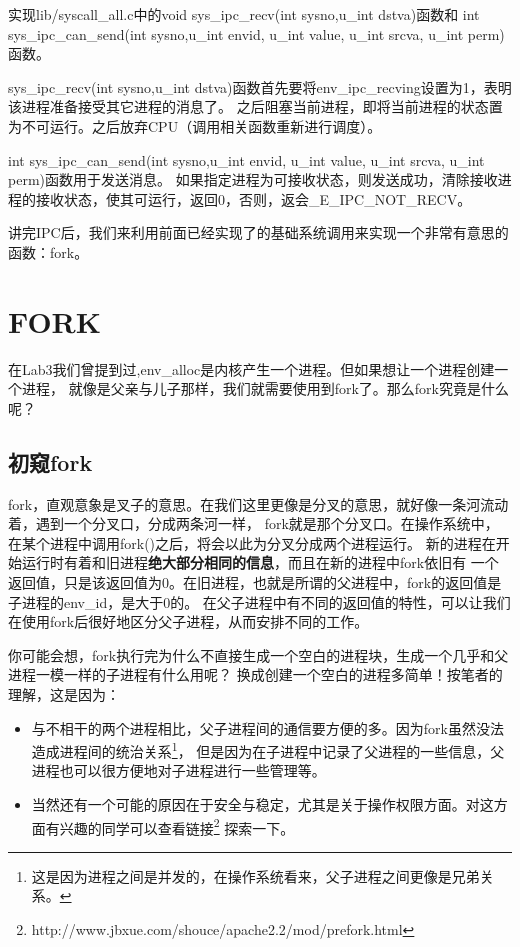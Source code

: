 \begin{exercise}
实现lib/syscall\_all.c中的void sys\_ipc\_recv(int sysno,u\_int dstva)函数和
int sys\_ipc\_can\_send(int sysno,u\_int envid, u\_int value, u\_int srcva, u\_int perm)函数。
\end{exercise}

sys\_ipc\_recv(int sysno,u\_int dstva)函数首先要将env\_ipc\_recving设置为1，表明该进程准备接受其它进程的消息了。
之后阻塞当前进程，即将当前进程的状态置为不可运行。之后放弃CPU（调用相关函数重新进行调度）。

int sys\_ipc\_can\_send(int sysno,u\_int envid, u\_int value, u\_int srcva, u\_int perm)函数用于发送消息。
如果指定进程为可接收状态，则发送成功，清除接收进程的接收状态，使其可运行，返回0，否则，返会\_E\_IPC\_NOT\_RECV。

讲完IPC后，我们来利用前面已经实现了的基础系统调用来实现一个非常有意思的函数：fork。

\section{FORK}

在Lab3我们曾提到过,env\_alloc是内核产生一个进程。但如果想让一个进程创建一个进程，
就像是父亲与儿子那样，我们就需要使用到fork了。那么fork究竟是什么呢？

\subsection{初窥fork}
fork，直观意象是叉子的意思。在我们这里更像是分叉的意思，就好像一条河流动着，遇到一个分叉口，分成两条河一样，
fork就是那个分叉口。在操作系统中，在某个进程中调用fork()之后，将会以此为分叉分成两个进程运行。
新的进程在开始运行时有着和旧进程\textbf{绝大部分相同的信息}，而且在新的进程中fork依旧有
一个返回值，只是该返回值为0。在旧进程，也就是所谓的父进程中，fork的返回值是子进程的env\_id，是大于0的。
在父子进程中有不同的返回值的特性，可以让我们在使用fork后很好地区分父子进程，从而安排不同的工作。

你可能会想，fork执行完为什么不直接生成一个空白的进程块，生成一个几乎和父进程一模一样的子进程有什么用呢？
换成创建一个空白的进程多简单！按笔者的理解，这是因为：
\begin{itemize}
 \item 与不相干的两个进程相比，父子进程间的通信要方便的多。因为fork虽然没法造成进程间的统治关系\footnote{这是因为进程之间是并发的，在操作系统看来，父子进程之间更像是兄弟关系。}，
但是因为在子进程中记录了父进程的一些信息，父进程也可以很方便地对子进程进行一些管理等。
 \item  当然还有一个可能的原因在于安全与稳定，尤其是关于操作权限方面。对这方面有兴趣的同学可以查看链接\footnote{http://www.jbxue.com/shouce/apache2.2/mod/prefork.html}
探索一下。
\end{itemize}

